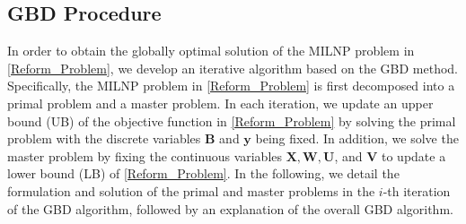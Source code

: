 \documentclass[12pt, draftclsnofoot, onecolumn]{IEEEtran}
\newtheorem{remark}{Remark}
\begin{document}
\subsection{GBD Procedure}
In order to obtain the globally optimal solution of the MILNP problem in \eqref{Reform_Problem}, we develop an iterative algorithm based on the GBD method. Specifically, the MILNP problem in \eqref{Reform_Problem} is first decomposed into a primal problem and a master problem. In each iteration, we update an upper bound (UB) of the objective function in \eqref{Reform_Problem} by solving the primal problem with the discrete variables $\mathbf{B}$ and $\mathbf{y}$ being fixed. In addition, we solve the master problem by fixing the continuous variables $\mathbf{X},\mathbf{W},\mathbf{U}$, and $\mathbf{V}$ to update a lower bound (LB) of \eqref{Reform_Problem}. In the following, we detail the formulation and solution of the primal and master problems in the $i$-th iteration of the GBD algorithm, followed by an explanation of the overall GBD algorithm.
\end{document}
